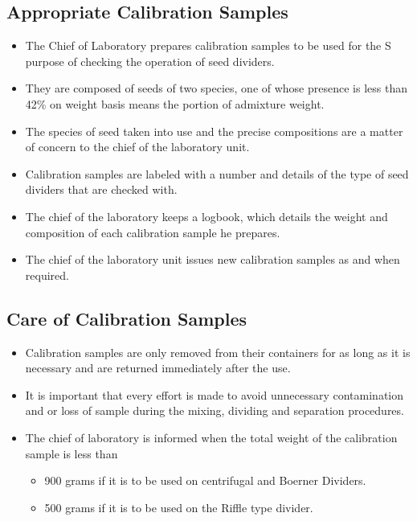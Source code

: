 \documentclass[]{book}
\providecommand{\tightlist}{%
  \setlength{\itemsep}{0pt}\setlength{\parskip}{0pt}}
\begin{document}
\subsection{Appropriate Calibration
Samples}\label{appropriate-calibration-samples}

\begin{itemize}
\tightlist
\item
  The Chief of Laboratory prepares calibration samples to be used for
  the S purpose of checking the operation of seed dividers.
\item
  They are composed of seeds of two species, one of whose presence is
  less than 42\% on weight basis means the portion of admixture weight.
\item
  The species of seed taken into use and the precise compositions are a
  matter of concern to the chief of the laboratory unit.
\item
  Calibration samples are labeled with a number and details of the type
  of seed dividers that are checked with.
\item
  The chief of the laboratory keeps a logbook, which details the weight
  and composition of each calibration sample he prepares.
\item
  The chief of the laboratory unit issues new calibration samples as and
  when required.
\end{itemize}

\subsection{Care of Calibration
Samples}\label{care-of-calibration-samples}

\begin{itemize}
\tightlist
\item
  Calibration samples are only removed from their containers for as long
  as it is necessary and are returned immediately after the use.
\item
  It is important that every effort is made to avoid unnecessary
  contamination and or loss of sample during the mixing, dividing and
  separation procedures.
\item
  The chief of laboratory is informed when the total weight of the
  calibration sample is less than

  \begin{itemize}
  \tightlist
  \item
    900 grams if it is to be used on centrifugal and Boerner Dividers.
  \item
    500 grams if it is to be used on the Riffle type divider.
  \end{itemize}
\end{itemize}
\end{document}
